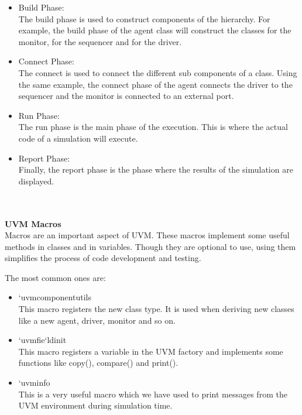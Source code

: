 \documentclass[a4paper,11pt]{article}
\begin{document}
\begin{itemize}

\item Build Phase:
\ \\
The build phase is used to construct components of the hierarchy. For example, the build phase of the agent class will construct the classes for the monitor, for the sequencer and for the driver.

\item Connect Phase:
\ \\
The connect is used to connect the different sub components of a class. Using the same example, the connect phase of the agent connects the driver to the sequencer and the monitor is connected to an external port.

\item Run Phase:
\ \\
The run phase is the main phase of the execution. This is where the actual code of a simulation will execute.

\item Report Phase:
\ \\
Finally, the report phase is the phase where the results of the simulation are displayed.

\end{itemize}
\ \\
\ \\
\textbf{UVM Macros}
\ \\
Macros are an important aspect of UVM. These macros implement some useful methods in classes and in variables. Though they are optional to use, using them simplifies the process of code development and testing.

The most common ones are:
\begin{itemize}

\item `uvm\textunderscore component\textunderscore utils
\ \\
This macro registers the new class type. It is used when deriving new classes like a new agent, driver, monitor and so on.

\item `uvm\textunderscore fie`ld\textunderscore init
\ \\
This macro registers a variable in the UVM factory and implements some functions like copy(), compare() and print().

\item `uvm\textunderscore info
\ \\
This is a very useful macro which we have used to print messages from the UVM environment during simulation time.


\end{itemize}
\end{document}
